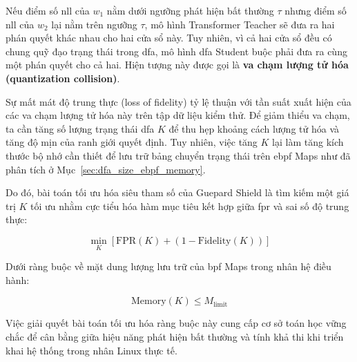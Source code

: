 \documentclass[../main.tex]{subfiles}
\begin{document}
Nếu điểm số \gls{nll} của $w_1$ nằm dưới ngưỡng phát hiện bất thường $\tau$
nhưng điểm số \gls{nll} của $w_2$ lại nằm trên ngưỡng $\tau$, mô hình
Transformer Teacher sẽ đưa ra hai phán quyết khác nhau cho hai cửa sổ
này. Tuy nhiên, vì cả hai cửa sổ đều có chung quỹ đạo trạng thái
trong \gls{dfa}, mô hình \gls{dfa} Student buộc phải đưa ra cùng một phán quyết
cho cả hai. Hiện tượng này được gọi là \textbf{va chạm lượng tử hóa
(quantization collision)}.

Sự mất mát độ trung thực (loss of fidelity) tỷ lệ thuận với tần suất
xuất hiện của các va chạm lượng tử hóa này trên tập dữ liệu kiểm thử.
Để giảm thiểu va chạm, ta cần tăng số lượng trạng thái \gls{dfa} $K$ để thu
hẹp khoảng cách lượng tử hóa và tăng độ mịn của ranh giới quyết định.
Tuy nhiên, việc tăng $K$ lại làm tăng kích thước bộ nhớ cần thiết để
lưu trữ bảng chuyển trạng thái trên \gls{ebpf} Maps như đã phân tích ở
Mục~\ref{sec:dfa_size_ebpf_memory}.

Do đó, bài toán tối ưu hóa siêu tham số của Guepard Shield là tìm
kiếm một giá trị $K$ tối ưu nhằm cực tiểu hóa hàm mục tiêu kết hợp
giữa \gls{fpr} và sai số độ trung thực:

\begin{equation}
  \label{eq:optimization_objective}
  \min_{K} \left[ \text{FPR}(K) + \left(1 - \text{Fidelity}(K)\right) \right]
\end{equation}

Dưới ràng buộc về mặt dung lượng lưu trữ của \gls{bpf} Maps trong nhân hệ điều hành:

\begin{equation}
  \label{eq:constraint}
  \text{Memory}(K) \le M_{\text{limit}}
\end{equation}

Việc giải quyết bài toán tối ưu hóa ràng buộc này cung cấp cơ sở toán
học vững chắc để cân bằng giữa hiệu năng phát hiện bất thường và tính
khả thi khi triển khai hệ thống trong nhân Linux thực tế.
\end{document}
